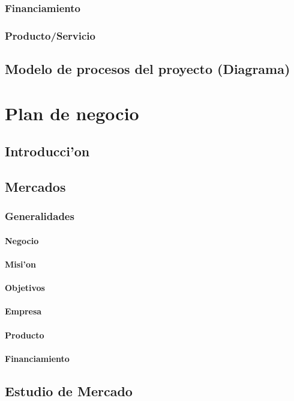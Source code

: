\documentclass[letterpaper,openright,10pt,oneside]{report}
\begin{document}
		\section{Financiamiento}
		\section{Producto/Servicio}
	\chapter{Modelo de procesos del proyecto (Diagrama)}
\part{Plan de negocio}
	\chapter{Introducci'on}
	\chapter{Mercados}
		\section{Generalidades}
			\subsection{Negocio}
			\subsection{Misi'on}
			\subsection{Objetivos}
			\subsection{Empresa}
			\subsection{Producto}
			\subsection{Financiamiento}
	\chapter{Estudio de Mercado}
\end{document}
